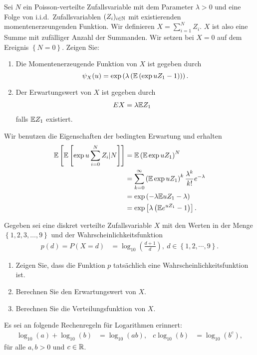 Sei $N$ ein Poisson-verteilte Zufallsvariable mit dem Parameter $\lambda>0$ und
eine Folge von i.i.d.\ Zufallsvariablen $(Z_i)_{i\in\mathbb N}$ mit existierenden
momentenerzeungenden Funktion. Wir definieren $X = \sum_{i=1}^{N} Z_i$. $X$ ist
also eine Summe mit zufälliger Anzahl der Summanden. Wir setzen bei $X=0$ auf
dem Ereignis $\left\{ N=0 \right\}$. Zeigen Sie:
\begin{enumerate}
    \item Die Momentenerzeugende Funktion von $X$ ist gegeben durch
        \begin{equation*}
            \psi_X(u) = \exp \left( \lambda \left( 
            \mathbb{E} \left( \exp uZ_1 -1 \right)
            \right) \right).
        \end{equation*}
    \item Der Erwartungswert von $X$ ist gegeben durch
        \begin{align*}
            E X &= \lambda \mathbb{E} Z_1 
        \end{align*}
        falls $\mathbb{E} Z_1$ existiert. 
\end{enumerate}

\solution Wir benutzen die Eigenschaften der bedingten Erwartung und erhalten
\begin{align*}
    \mathbb{E} \left[ \mathbb{E} \left[ \exp u \sum_{i=0}^{N} Z_i | N \right] \right] &= 
    \mathbb{E} \left( \mathbb{E} \exp uZ_1 \right)^N \\
    &= \sum_{k=0}^{\infty} \left( \mathbb{E} \exp u Z_1 \right)^k \frac{\lambda^k}{k!} e^{-\lambda} \\
    &= \exp \left( -\lambda \mathbb{E} u Z_1  - \lambda\right)  \\
    &= \exp \left[  \lambda\left( \mathbb{E} e^{uZ_1} -1 \right)  \right].
\end{align*}

Gegeben sei eine diskret verteilte Zufallsvariable $X$ mit den Werten in der Menge
$\left\{ 1,2,3,\dots ,9 \right\}$ und der Wahrscheinlichkeitsfunktion
\begin{align*}
    p(d) = P(X = d) &= \log_{10} \left( \frac{d+1}{d} \right),\  d \in \left\{ 1,2,\cdots,9 \right\}.
\end{align*}
\begin{enumerate}
    \item Zeigen Sie, dass die Funktion $p$ tatsächlich eine Wahrscheinlichkeitsfunktion ist.
    \item Berechnen Sie den Erwartungswert von $X$.
    \item Berechnen Sie die Verteilungsfunktion von $X$. 
\end{enumerate}
Es sei an folgende Rechenregeln für Logarithmen erinnert:
\begin{align*}
    \log_{10} (a) + \log_{10} (b) &= \log_{10} \left( ab \right), &
    c \log_{10} \left( b \right) &= \log_{10}\left( b^{c} \right),
\end{align*}
für alle $a,b>0$ und $c\in\mathbb{R}$.

